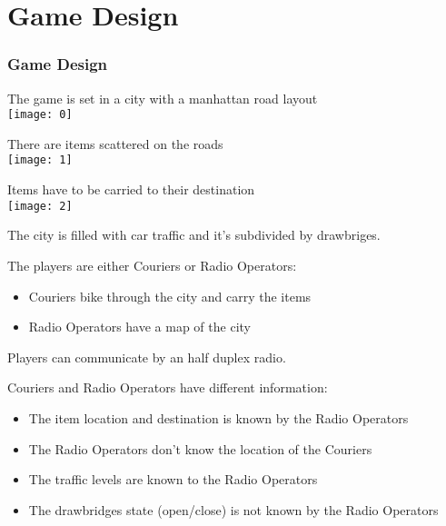 \documentclass{beamer}
\begin{document}
\section{Game Design}

\begin{frame}
\frametitle{Game Design}
\end{frame}

\begin{frame}
	\begin{center}
	
		The game is set in a city with a manhattan road layout
		\\
		\medskip
		\texttt{[image: 0]}
	
	\end{center}
\end{frame}

\begin{frame}
	\begin{center}
	
		There are items scattered on the roads
		\\
		\medskip
		\texttt{[image: 1]}
	\end{center}
\end{frame}

\begin{frame}
	\begin{center}

		Items have to be carried to their destination
		\\
		\medskip
		\texttt{[image: 2]}
	
	\end{center}
\end{frame}

\begin{frame}
The city is filled with car traffic and it's subdivided by drawbriges.
\end{frame}

\begin{frame}
The players are either Couriers or Radio Operators:
	\begin{itemize}
		\item Couriers bike through the city and carry the items
		\item Radio Operators have a map of the city
	\end{itemize}
Players can communicate by an half duplex radio.
\end{frame}

\begin{frame}
Couriers and Radio Operators have different information:
	\begin{itemize}
		\item The item location and destination is known by the Radio Operators
		\item The Radio Operators don't know the location of the Couriers
		\item The traffic levels are known to the Radio Operators
		\item The drawbridges state (open/close) is not known by the Radio Operators
	\end{itemize}
\end{frame}
\end{document}
